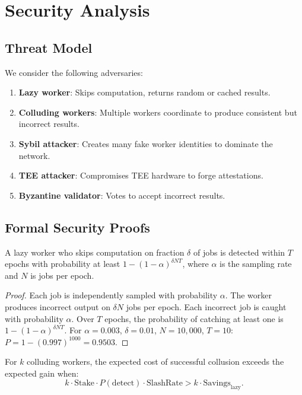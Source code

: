\section{Security Analysis}

\label{sec:security}

\subsection{Threat Model}

We consider the following adversaries:

\begin{enumerate}[leftmargin=1.4em]
    \item \textbf{Lazy worker}: Skips computation, returns random or cached results.
    \item \textbf{Colluding workers}: Multiple workers coordinate to produce consistent but incorrect results.
    \item \textbf{Sybil attacker}: Creates many fake worker identities to dominate the network.
    \item \textbf{TEE attacker}: Compromises TEE hardware to forge attestations.
    \item \textbf{Byzantine validator}: Votes to accept incorrect results.
\end{enumerate}

\subsection{Formal Security Proofs}

\begin{theorem}
A lazy worker who skips computation on fraction $\delta$ of jobs is detected within $T$ epochs with probability at least $1 - (1-\alpha)^{\delta N T}$, where $\alpha$ is the sampling rate and $N$ is jobs per epoch.
\end{theorem}

\begin{proof}
Each job is independently sampled with probability $\alpha$. The worker produces incorrect output on $\delta N$ jobs per epoch. Each incorrect job is caught with probability $\alpha$. Over $T$ epochs, the probability of catching at least one is $1 - (1-\alpha)^{\delta N T}$. For $\alpha = 0.003$, $\delta = 0.01$, $N = 10{,}000$, $T = 10$: $P = 1 - (0.997)^{1000} = 0.9503$.
\end{proof}

\begin{theorem}
For $k$ colluding workers, the expected cost of successful collusion exceeds the expected gain when:
\begin{equation}
k \cdot \text{Stake} \cdot P(\text{detect}) \cdot \text{SlashRate} > k \cdot \text{Savings}_{\text{lazy}}.
\end{equation}
\end{theorem}

